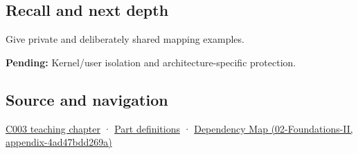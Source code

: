 \subsection{Recall and next depth}\label{appendix-c2a9ad1e2b49-recall-and-next-depth}

Give private and deliberately shared mapping examples.

\textbf{Pending:} Kernel/user isolation and architecture-specific protection.

\subsection{Source and navigation}\label{appendix-c2a9ad1e2b49-source-and-navigation}

\hyperref[01-foundations-i-ch002-where-the-bytes-live]{C003 teaching chapter} · \hyperref[appendix-fd090d982a15-m003---parts-41-60]{Part definitions} · \href{../02-Foundations-II/main.pdf\#nameddest=appendix-4ad47bdd269a}{Dependency Map (02-Foundations-II, appendix-4ad47bdd269a)}
